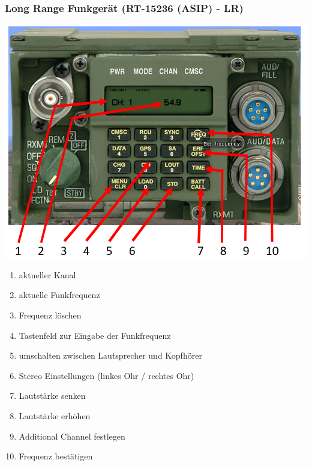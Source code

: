 \subsubsection{Long Range Funkgerät (RT-15236 (ASIP) - LR)}
\begin{minipage}[t]{1\textwidth}
	\includegraphics[width=\textwidth]{./img/tutorials/tfar/TFAR_LR_Radio.png}
\end{minipage}
\begin{enumerate}
	\item aktueller Kanal
	\item aktuelle Funkfrequenz
	\item Frequenz löschen
	\item Tastenfeld zur Eingabe der Funkfrequenz
	\item umschalten zwischen Lautsprecher und Kopfhörer
	\item Stereo Einstellungen (linkes Ohr / rechtes Ohr)
	\item Lautstärke  senken
	\item Lautstärke erhöhen
	\item Additional Channel festlegen
	\item Frequenz bestätigen
\end{enumerate}
